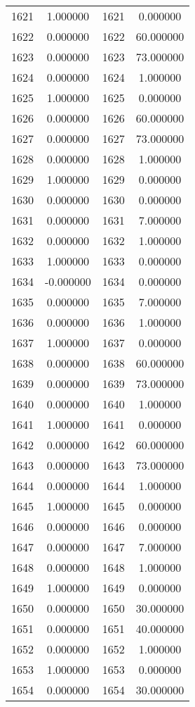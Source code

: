 \documentclass[12pt]{article}
\begin{document}
\begin{longtable}{@{}cccc@{}}
1621 & 1.000000 & 1621 & 0.000000 \\
1622 & 0.000000 & 1622 & 60.000000 \\
1623 & 0.000000 & 1623 & 73.000000 \\
1624 & 0.000000 & 1624 & 1.000000 \\
1625 & 1.000000 & 1625 & 0.000000 \\
1626 & 0.000000 & 1626 & 60.000000 \\
1627 & 0.000000 & 1627 & 73.000000 \\
1628 & 0.000000 & 1628 & 1.000000 \\
1629 & 1.000000 & 1629 & 0.000000 \\
1630 & 0.000000 & 1630 & 0.000000 \\
1631 & 0.000000 & 1631 & 7.000000 \\
1632 & 0.000000 & 1632 & 1.000000 \\
1633 & 1.000000 & 1633 & 0.000000 \\
1634 & -0.000000 & 1634 & 0.000000 \\
1635 & 0.000000 & 1635 & 7.000000 \\
1636 & 0.000000 & 1636 & 1.000000 \\
1637 & 1.000000 & 1637 & 0.000000 \\
1638 & 0.000000 & 1638 & 60.000000 \\
1639 & 0.000000 & 1639 & 73.000000 \\
1640 & 0.000000 & 1640 & 1.000000 \\
1641 & 1.000000 & 1641 & 0.000000 \\
1642 & 0.000000 & 1642 & 60.000000 \\
1643 & 0.000000 & 1643 & 73.000000 \\
1644 & 0.000000 & 1644 & 1.000000 \\
1645 & 1.000000 & 1645 & 0.000000 \\
1646 & 0.000000 & 1646 & 0.000000 \\
1647 & 0.000000 & 1647 & 7.000000 \\
1648 & 0.000000 & 1648 & 1.000000 \\
1649 & 1.000000 & 1649 & 0.000000 \\
1650 & 0.000000 & 1650 & 30.000000 \\
1651 & 0.000000 & 1651 & 40.000000 \\
1652 & 0.000000 & 1652 & 1.000000 \\
1653 & 1.000000 & 1653 & 0.000000 \\
1654 & 0.000000 & 1654 & 30.000000 \\

\end{longtable}
\end{document}
